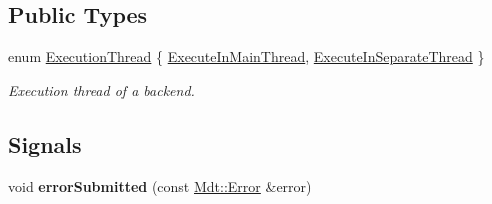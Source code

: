 \subsection*{Public Types}
\begin{DoxyCompactItemize}
\item 
enum \hyperlink{class_mdt_1_1_error_logger_1_1_logger_ab6d6198b43b2bb94cede114ec67b781c}{Execution\+Thread} \{ \hyperlink{class_mdt_1_1_error_logger_1_1_logger_ab6d6198b43b2bb94cede114ec67b781caac54433e68e1f766627c9fcc87f7b818}{Execute\+In\+Main\+Thread}, 
\hyperlink{class_mdt_1_1_error_logger_1_1_logger_ab6d6198b43b2bb94cede114ec67b781caf7dfdc36418cac0a65cea2cde2a11fd7}{Execute\+In\+Separate\+Thread}
 \}\begin{DoxyCompactList}\small\item\em Execution thread of a backend. \end{DoxyCompactList}
\end{DoxyCompactItemize}
\subsection*{Signals}
\begin{DoxyCompactItemize}
\item 
void {\bfseries error\+Submitted} (const \hyperlink{class_mdt_1_1_error}{Mdt\+::\+Error} \&error)\hypertarget{class_mdt_1_1_error_logger_1_1_logger_ad377a1c19dc739051eebf76bec5316d8}{}\label{class_mdt_1_1_error_logger_1_1_logger_ad377a1c19dc739051eebf76bec5316d8}

\end{DoxyCompactItemize}
